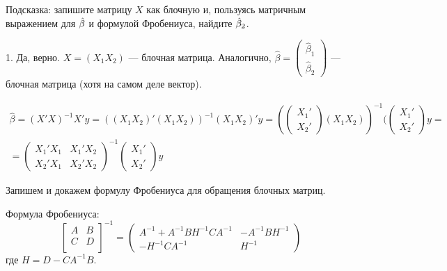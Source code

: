 \begin{solution}
Подсказка: запишите матрицу $X$ как блочную и, пользуясь матричным выражением для $\hat{\beta}$ и формулой Фробениуса, найдите $\hat{\beta}_2$.

1. Да, верно.
$X=(X_1 X_2)$ --- блочная матрица. Аналогично, $\hat\beta=\left(\begin{array}{c}
\hat\beta_1\\ 
\hat\beta_2
\end{array}\right)$ --- блочная матрица (хотя на самом деле вектор).

\begin{multline*}
\hat\beta=(X'X)^{-1}X'y=((X_1X_2)'(X_1X_2))^{-1}(X_1X_2)'y=(\left(\begin{array}{c}
X_1'\\ 
X_2'
\end{array}\right)(X_1X_2))^{-1}(\left(\begin{array}{c}
X_1'\\ 
X_2'
\end{array}\right)y=\\=
\left(\begin{array}{cc}
X_1'X_1 & X_1'X_2\\ 
X_2'X_1 & X_2'X_2
\end{array}\right)^{-1}\left(\begin{array}{c}
X_1'\\ 
X_2'
\end{array}\right)y
\end{multline*}

Запишем и докажем формулу Фробениуса для обращения блочных матриц.

Формула Фробениуса:
\[
\begin{bmatrix} A & B \\ 
C & D \\ 
\end{bmatrix}^{-1}=
\begin{pmatrix} 
A^{-1} +A^{-1} BH^{-1} CA^{-1}  & -A^{-1} BH^{-1}\\
 -H^{-1} CA^{-1}  & H^{-1}
\end{pmatrix} 
\]
где $H=D-CA^{-1}B$.


\end{solution}
